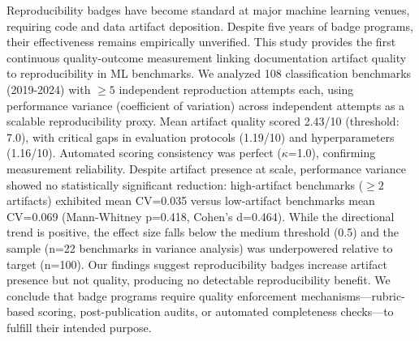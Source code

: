 
Reproducibility badges have become standard at major machine learning venues, requiring code and data artifact deposition. Despite five years of badge programs, their effectiveness remains empirically unverified. This study provides the first continuous quality-outcome measurement linking documentation artifact quality to reproducibility in ML benchmarks. We analyzed 108 classification benchmarks (2019-2024) with $\geq 5$ independent reproduction attempts each, using performance variance (coefficient of variation) across independent attempts as a scalable reproducibility proxy. Mean artifact quality scored 2.43/10 (threshold: 7.0), with critical gaps in evaluation protocols (1.19/10) and hyperparameters (1.16/10). Automated scoring consistency was perfect ($\kappa$=1.0), confirming measurement reliability. Despite artifact presence at scale, performance variance showed no statistically significant reduction: high-artifact benchmarks ($\geq 2$ artifacts) exhibited mean CV=0.035 versus low-artifact benchmarks mean CV=0.069 (Mann-Whitney p=0.418, Cohen's d=0.464). While the directional trend is positive, the effect size falls below the medium threshold (0.5) and the sample (n=22 benchmarks in variance analysis) was underpowered relative to target (n=100). Our findings suggest reproducibility badges increase artifact presence but not quality, producing no detectable reproducibility benefit. We conclude that badge programs require quality enforcement mechanisms---rubric-based scoring, post-publication audits, or automated completeness checks---to fulfill their intended purpose.
